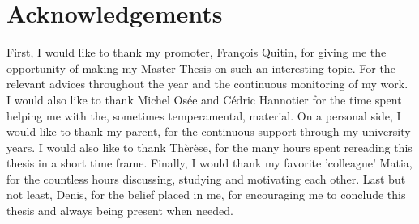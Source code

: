 % 			 
%
%

\chapter*{Acknowledgements}

First, I would like to thank my promoter, François Quitin, for giving me the opportunity of making my Master Thesis on such an interesting topic. For the relevant advices throughout the year and the continuous monitoring of my work.
I would also like to thank Michel Osée and Cédric Hannotier for the time spent helping me with the, sometimes temperamental, material. On a personal side, I would like to thank my parent, for the continuous support through my university years. I would also like to thank Thèrèse, for the many hours spent rereading this thesis in a short time frame. Finally, I would thank my favorite 'colleague' Matia, for the countless hours discussing, studying and motivating each other. Last but not least, Denis, for the belief placed in me, for encouraging me to conclude this thesis and always being present when needed.